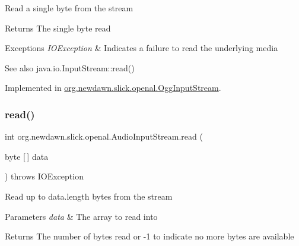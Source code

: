 Read a single byte from the stream

\begin{DoxyReturn}{Returns}
The single byte read 
\end{DoxyReturn}

\begin{DoxyExceptions}{Exceptions}
{\em I\+O\+Exception} & Indicates a failure to read the underlying media \\
\hline
\end{DoxyExceptions}
\begin{DoxySeeAlso}{See also}
java.\+io.\+Input\+Stream\+::read() 
\end{DoxySeeAlso}


Implemented in \mbox{\hyperlink{classorg_1_1newdawn_1_1slick_1_1openal_1_1_ogg_input_stream_a66397cab8bce3c41ce7bcb4447a66a46}{org.\+newdawn.\+slick.\+openal.\+Ogg\+Input\+Stream}}.

\mbox{\label{interfaceorg_1_1newdawn_1_1slick_1_1openal_1_1_audio_input_stream_a1e8c74e2bc52725377b2b859da92a4af}} 
\subsubsection{\texorpdfstring{read()}{read()}\hspace{0.1cm}{\footnotesize\ttfamily [2/3]}}
{\footnotesize\ttfamily int org.\+newdawn.\+slick.\+openal.\+Audio\+Input\+Stream.\+read (\begin{DoxyParamCaption}\item[{byte \mbox{[}$\,$\mbox{]}}]{data }\end{DoxyParamCaption}) throws I\+O\+Exception}

Read up to data.\+length bytes from the stream


\begin{DoxyParams}{Parameters}
{\em data} & The array to read into \\
\hline
\end{DoxyParams}
\begin{DoxyReturn}{Returns}
The number of bytes read or -\/1 to indicate no more bytes are available 
\end{DoxyReturn}

